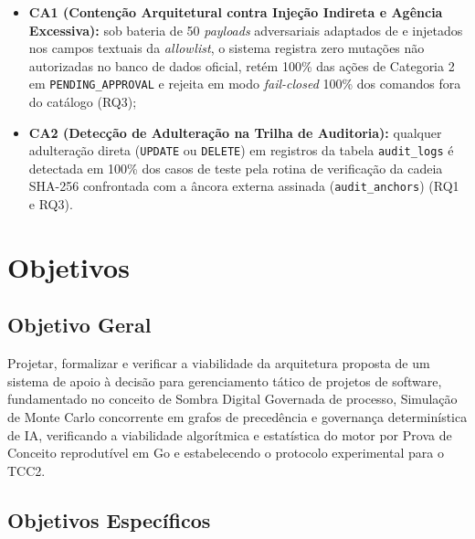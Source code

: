 \documentclass[12pt,openany,oneside,a4paper,english,brazilian,sumario=tradicional]{abntex2}
\begin{document}
\begin{itemize}
  \item \textbf{CA1 (Contenção Arquitetural contra Injeção Indireta e Agência Excessiva):} sob bateria de 50 \textit{payloads} adversariais adaptados de  e  injetados nos campos textuais da \textit{allowlist}, o sistema registra zero mutações não autorizadas no banco de dados oficial, retém 100\% das ações de Categoria 2 em \texttt{PENDING\_APPROVAL} e rejeita em modo \textit{fail-closed} 100\% dos comandos fora do catálogo (RQ3);
  \item \textbf{CA2 (Detecção de Adulteração na Trilha de Auditoria):} qualquer adulteração direta (\texttt{UPDATE} ou \texttt{DELETE}) em registros da tabela \texttt{audit\_logs} é detectada em 100\% dos casos de teste pela rotina de verificação da cadeia SHA-256 confrontada com a âncora externa assinada (\texttt{audit\_anchors}) (RQ1 e RQ3).
\end{itemize}

\section{Objetivos}

\subsection{Objetivo Geral}

Projetar, formalizar e verificar a viabilidade da arquitetura proposta de um sistema de apoio à decisão para gerenciamento tático de projetos de software, fundamentado no conceito de Sombra Digital Governada de processo, Simulação de Monte Carlo concorrente em grafos de precedência e governança determinística de IA, verificando a viabilidade algorítmica e estatística do motor por Prova de Conceito reprodutível em Go e estabelecendo o protocolo experimental para o TCC2.

\subsection{Objetivos Específicos}
\end{document}
